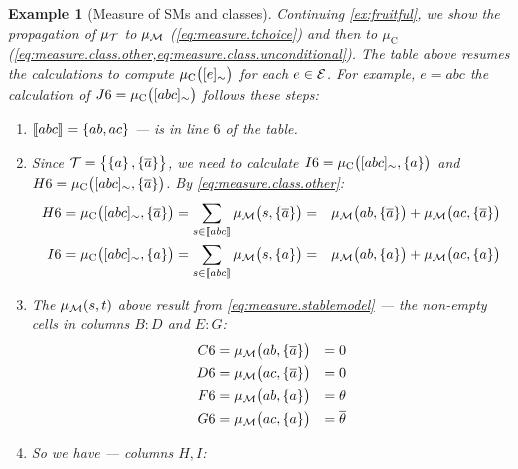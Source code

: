 \documentclass[a4paper]{article}
\newtheorem{example}{Example}
\newtheorem{example}{Example}
\newcommand{\at}[1]{\ensuremath{\!\del{#1}}}        %
\newcommand{\cla}[1]{\ensuremath{{\cal #1}}}        %
\newcommand{\co}[1]{\ensuremath{\overline{#1}}}     %
\newcommand{\TCHOICEset}{\ensuremath{\cla{T}}}
\newcommand{\MODELset}{\ensuremath{\cla{M}}}
\newcommand{\EVENTSset}{\ensuremath{\cla{E}}}
\newcommand{\pwT}{\ensuremath{\mu_{\TCHOICEset}}}
\newcommand{\pwM}{\ensuremath{\mu_{\MODELset}}}
\newcommand{\pwm}[1]{\ensuremath{\pwM\at{#1}}}
\newcommand{\pwC}{\ensuremath{\mu_{\textrm{C}}}}
\newcommand{\pwc}[1]{\ensuremath{\pwC\at{#1}}}
\newcommand{\stablecore}[1]{\ensuremath{\left\llbracket #1 \right\rrbracket}}
\newcommand{\class}[1]{\ensuremath{[{#1}]_{\sim}}}
\begin{document}
{\begin{example}[Measure of \aclp{SM} and classes]
      Continuing \cref{ex:fruitful}, we show the propagation of \(\pwT\) to \(\pwM\) (\cref{eq:measure.tchoice}) and then to \(\pwC\) (\cref{eq:measure.class.other,eq:measure.class.unconditional}). The table above resumes the calculations to compute \(\pwc{\class{e}}\) for each \(e \in \EVENTSset\). For example, \(e = abc\) the calculation of \(J6 = \pwc{\class{abc}}\) follows these steps:
      \begin{enumerate}
          \item \(\stablecore{abc} = \set{ab,ac}\) --- is in line \(6\) of the table.
          \item Since \(\TCHOICEset = \set{\set{a}, \set{\co{a}}}\), we need to calculate \(I6 = \pwc{\class{abc}, \set{a}}\) and \(H6 = \pwc{\class{abc}, \set{\co{a}}}\). By \cref{eq:measure.class.other}:
                \begin{equation*}
                    \begin{aligned}
                        H6 = \pwc{\class{abc}, \set{\co{a}}} & = \sum_{s \in \stablecore{abc}} \pwm{s, \set{\co{a}}}
                        =                                    & \pwm{ab, \set{\co{a}}} +  \pwm{ac, \set{\co{a}}}      \\
                        I6 = \pwc{\class{abc}, \set{a}}      & = \sum_{s \in \stablecore{abc}} \pwm{s, \set{a}}
                        =                                    & \pwm{ab, \set{a}} +  \pwm{ac, \set{a}}
                    \end{aligned}
                \end{equation*}
          \item The \(\pwm{s,t}\) above result from \cref{eq:measure.stablemodel} --- the non-empty cells in columns \(B:D\) and \(E:G\):
                \begin{equation*}
                    \begin{aligned}
                        C6 & = \pwm{ab, \set{\co{a}}} & = 0           \\
                        D6 & = \pwm{ac, \set{\co{a}}} & = 0           \\
                        F6 & = \pwm{ab, \set{a}}      & = \theta      \\
                        G6 & = \pwm{ac, \set{a}}      & = \co{\theta}
                    \end{aligned}
                \end{equation*}
          \item So we have --- columns \(H, I\):
                \begin{equation*}

\end{equation*}
\end{enumerate}
\end{example}}
\end{document}
